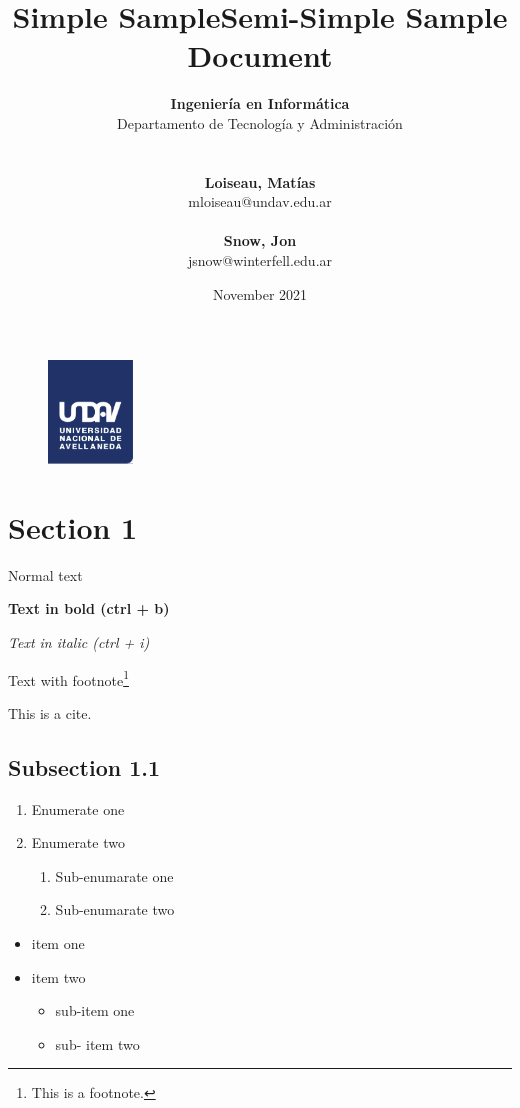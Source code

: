 \documentclass{article} %
\title{Simple Sample} %
\author{
	\textbf{Ingeniería en Informática}\\
	Departamento de Tecnología y Administración\\
	\\~\\
	\textbf{Loiseau, Matías}\\
	mloiseau@undav.edu.ar
 	\\~\\
 	\textbf{Snow, Jon}\\
 	jsnow@winterfell.edu.ar
}
\title{Semi-Simple Sample Document}
\date{November 2021}
\begin{document}

\begin{figure}
\centering
	\includegraphics[width=0.2\textwidth]{images/undav-logo}
	\label{fig:undav-logo}
\end{figure}
\maketitle %

\thispagestyle{empty} %
\cleardoublepage

\cleardoublepage
\tableofcontents %
\cleardoublepage

\section{Section 1} %
Normal text

\textbf{Text in bold (ctrl + b)}

\textit{Text in italic (ctrl + i)}

Text with footnote\footnote{This is a footnote.}

This is a cite\cite{knn}.

\subsection{Subsection 1.1}

\begin{enumerate}
	\item Enumerate one
	\item Enumerate two
	\begin{enumerate}
		\item Sub-enumarate one
		\item Sub-enumarate two
	\end{enumerate}
\end{enumerate}

\begin{itemize}
	\item item one
	\item item two
	\begin{itemize}
		\item sub-item one
		\item sub-	item two
	\end{itemize}
\end{itemize}
\end{document}
